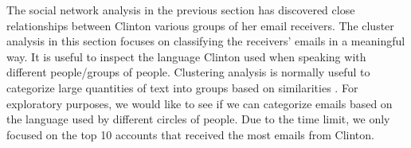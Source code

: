 The social network analysis in the previous section has discovered close relationships between Clinton various groups of her email receivers. The cluster analysis in this section focuses on classifying the receivers' emails in a meaningful way. It is useful to inspect the language Clinton used when speaking with different people/groups of people. Clustering analysis is normally useful to categorize large quantities of text into groups based on similarities \cite{voorhees1986implementing} \cite{gentle2015}. For exploratory purposes, we would like to see if we can categorize emails based on the language used by different circles of people. Due to the time limit, we only focused on the top 10 accounts that received the most emails from Clinton.

